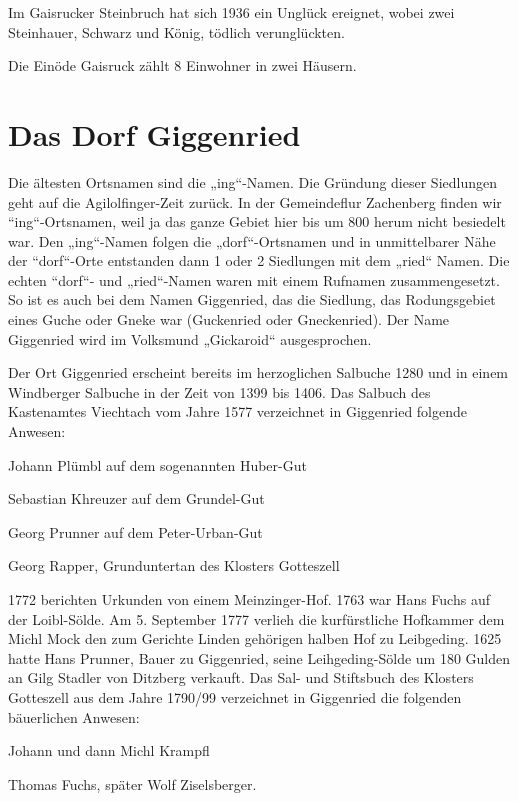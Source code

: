 \documentclass{book}
\begin{document}
Im Gaisrucker Steinbruch hat sich 1936 ein Unglück ereignet, wobei zwei
Steinhauer, Schwarz und König, tödlich verunglückten.

Die Einöde Gaisruck zählt 8 Einwohner in zwei Häusern.

\section{Das Dorf Giggenried}

Die ältesten Ortsnamen sind die „ing“-Namen. Die Gründung dieser
Siedlungen geht auf die Agilolfinger-Zeit zurück. In der Gemeindeflur
Zachenberg finden wir “ing“-Ortsnamen, weil ja das ganze Gebiet hier bis
um 800 herum nicht besiedelt war. Den „ing“-Namen folgen die
„dorf“-Ortsnamen und in unmittelbarer Nähe der “dorf“-Orte entstanden
dann 1 oder 2 Siedlungen mit dem „ried“ Namen. Die echten “dorf“- und
„ried“-Namen waren mit einem Rufnamen zusammengesetzt. So ist es auch
bei dem Namen Giggenried, das die Siedlung, das Rodungsgebiet eines
Guche oder Gneke war (Guckenried oder Gneckenried). Der Name Giggenried
wird im Volksmund „Gickaroid“ ausgesprochen.

Der Ort Giggenried erscheint bereits im herzoglichen Salbuche 1280 und
in einem Windberger Salbuche in der Zeit von 1399 bis 1406. Das Salbuch
des Kastenamtes Viechtach vom Jahre 1577 verzeichnet in Giggenried
folgende Anwesen:

\begin{compactitem}
\item Johann Plümbl auf dem sogenannten Huber-Gut
\item Sebastian Khreuzer auf dem Grundel-Gut
\item Georg Prunner auf dem Peter-Urban-Gut
\item Georg Rapper, Grunduntertan des Klosters Gotteszell
\end{compactitem}

1772 berichten Urkunden von einem Meinzinger-Hof. 1763 war Hans Fuchs
auf der Loibl-Sölde. Am 5. September 1777 verlieh die kurfürstliche
Hofkammer dem Michl Mock den zum Gerichte Linden gehörigen halben Hof zu
Leibgeding. 1625 hatte Hans Prunner, Bauer zu Giggenried, seine
Leihgeding-Sölde um 180 Gulden an Gilg Stadler von Ditzberg verkauft.
Das Sal- und Stiftsbuch des Klosters Gotteszell aus dem Jahre 1790/99
verzeichnet in Giggenried die folgenden bäuerlichen Anwesen:

\begin{compactitem}
\item Johann und dann Michl Krampfl
\item Thomas Fuchs, später Wolf Ziselsberger.
\end{compactitem}
\end{document}
